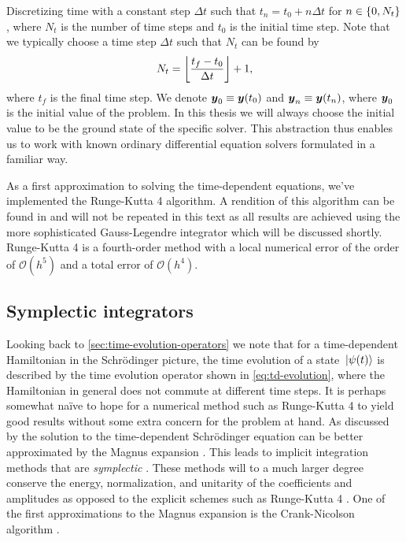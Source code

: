             Discretizing time with a constant step $\Delta t$ such that $t_n
            = t_0 + n \Delta t$ for $n \in \left\{ 0, N_t \right\}$, where $N_t$ is the number of
            time steps and $t_0$ is the initial time step.
            Note that we typically choose a time step $\Delta t$ such that $N_t$ can be
            found by
            \begin{align}
                N_t = \left\lfloor \frac{t_f - t_0}{\Delta t} \right\rfloor + 1,
            \end{align}
            where $t_f$ is the final time step.
            We denote $\boldsymbol{y}_0 \equiv \boldsymbol{y}(t_0)$ and $\boldsymbol{y}_n \equiv
            \boldsymbol{y}(t_n)$, where $\boldsymbol{y}_0$ is the initial value of the
            problem.
            In this thesis we will always choose the initial value to be the
            ground state of the specific solver.
            This abstraction thus enables us to work with known ordinary
            differential equation solvers formulated in a familiar way.

            As a first approximation to solving the time-dependent equations,
            we've implemented the Runge-Kutta 4 algorithm.
            A rendition of this algorithm can be found in
             \cite{morken2017notes} and will not be
            repeated in this text as all results are achieved using the more
            sophisticated Gauss-Legendre integrator which will be discussed
            shortly.
            Runge-Kutta 4 is a fourth-order method with a local numerical error
            of the order of $\mathcal{O}(h^5)$ and a total error of
            $\mathcal{O}(h^4)$.

        \subsection{Symplectic integrators}
            \label{subsec:symplectic}
            Looking back to \autoref{sec:time-evolution-operators} we note that
            for a time-dependent Hamiltonian in the Schrödinger picture, the
            time evolution of a state $\ket*{\psi(t)}$ is described by the
            time evolution operator shown in \autoref{eq:td-evolution}, where
            the Hamiltonian in general does not commute at different time steps.
            It is perhaps somewhat naïve to hope for a numerical method such as
            Runge-Kutta 4 to yield good results without some extra concern for
            the problem at hand.
            As discussed by \citeauthor{joshua-magnus} \cite{joshua-magnus} the
            solution to the time-dependent Schrödinger equation can be better
            approximated by the Magnus expansion \cite{magnus-expansion}.
            This leads to implicit integration methods that are
            \emph{symplectic} \cite{joshua-magnus}.
            These methods will to a much larger degree conserve the energy,
            normalization, and unitarity of the coefficients and amplitudes as
            opposed to the explicit schemes such as Runge-Kutta 4
            \cite{joshua-magnus, pedersen2018symplectic}.
            One of the first approximations to the Magnus expansion is the
            Crank-Nicolson algorithm \cite{ullrich2011time, joshua-magnus}.


